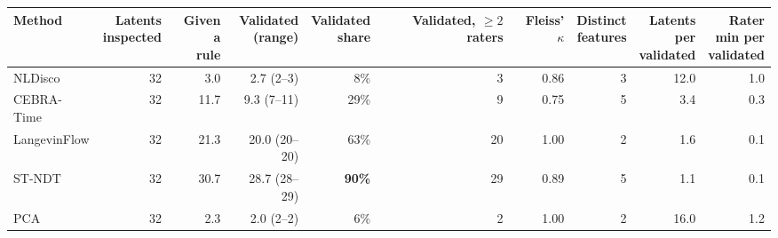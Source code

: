 \begin{tabular*}{\linewidth}{@{\extracolsep{\fill}}lrrrrrrrrr@{}}
\toprule
Method & \shortstack{Latents\\inspected} & \shortstack{Given a\\rule} & \shortstack{Validated\\(range)} & \shortstack{Validated\\share} & \shortstack{Validated,\\$\geq2$ raters} & \shortstack{Fleiss'\\$\kappa$} & \shortstack{Distinct\\features} & \shortstack{Latents\\per\\validated} & \shortstack{Rater\\min per\\validated} \\
\midrule
NLDisco & 32 & 3.0 & 2.7 (2--3) & 8\% & 3 & 0.86 & 3 & 12.0 & 1.0 \\
CEBRA-Time & 32 & 11.7 & 9.3 (7--11) & 29\% & 9 & 0.75 & 5 & 3.4 & 0.3 \\
LangevinFlow & 32 & 21.3 & 20.0 (20--20) & 63\% & 20 & 1.00 & 2 & 1.6 & 0.1 \\
ST-NDT & 32 & 30.7 & 28.7 (28--29) & \textbf{90\%} & 29 & 0.89 & 5 & 1.1 & 0.1 \\
PCA & 32 & 2.3 & 2.0 (2--2) & 6\% & 2 & 1.00 & 2 & 16.0 & 1.2 \\
\bottomrule
\end{tabular*}
